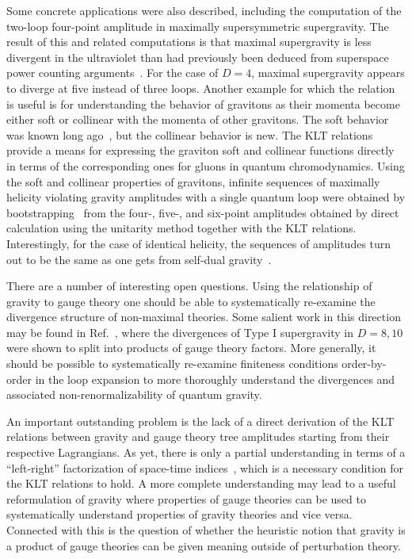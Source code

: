 Some concrete applications were also described, including the
computation of the two-loop four-point amplitude in maximally
supersymmetric supergravity. The result of this and related
computations is that maximal supergravity is less divergent in the
ultraviolet than had previously been deduced from superspace power
counting arguments~\cite{BDDPR,Stelle}.  For the case of
$D=4$, maximal supergravity appears to diverge at five instead of
three loops.  Another example for which the relation is useful is for
understanding the behavior of gravitons as their momenta become either
soft or collinear with the momenta of other gravitons.  The soft
behavior was known long ago~\cite{WeinbergSoftG}, but the collinear
behavior is new.  The KLT relations provide a means for expressing the
graviton soft and collinear functions directly in terms of the
corresponding ones for gluons in quantum chromodynamics.  Using the
soft and collinear properties of gravitons, infinite sequences of
maximally helicity violating gravity amplitudes with a single quantum
loop were obtained by bootstrapping~\cite{AllPlusGrav,MHVGrav} from
the four-, five-, and six-point amplitudes obtained by direct
calculation using the unitarity method together with the KLT
relations.  Interestingly, for the case of identical helicity, the
sequences of amplitudes turn out to be the same as one gets from
self-dual gravity~\cite{Plebanski75,Duff79,Plebanski96}.

There are a number of interesting open questions.  Using the
relationship of gravity to gauge theory one should be able to
systematically re-examine the divergence structure of non-maximal
theories.  Some salient work in this direction may be found in
Ref.~\cite{DunbarJulia}, where the divergences of Type I supergravity
in $D=8, 10$ were shown to split into products of gauge theory
factors.  More generally, it should be possible to systematically
re-examine finiteness conditions order-by-order in the loop expansion
to more thoroughly understand the divergences and associated
non-renormalizability of quantum gravity.

An important outstanding problem is the lack of a direct derivation of
the KLT relations between gravity and gauge theory tree amplitudes
starting from their respective Lagrangians.  As yet, there is only a
partial understanding in terms of a ``left-right'' factorization of
space-time indices~\cite{Siegel93A,Siegel93B,Siegel94,BernGrant}, which
is a necessary condition for the KLT relations to hold.  A more
complete understanding may lead to a useful reformulation of gravity
where properties of gauge theories can be used to systematically
understand properties of gravity theories and vice versa.  Connected
with this is the question of whether the heuristic notion that gravity
is a product of gauge theories can be given meaning outside of
perturbation theory.


